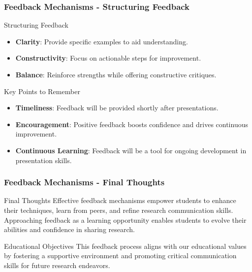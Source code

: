 \documentclass[aspectratio=169]{beamer}
\begin{document}
\begin{frame}[fragile]
    \frametitle{Feedback Mechanisms - Structuring Feedback}
    \begin{block}{Structuring Feedback}
        \begin{itemize}
            \item \textbf{Clarity}: Provide specific examples to aid understanding.
            \item \textbf{Constructivity}: Focus on actionable steps for improvement.
            \item \textbf{Balance}: Reinforce strengths while offering constructive critiques.
        \end{itemize}
    \end{block}
    
    \begin{block}{Key Points to Remember}
        \begin{itemize}
            \item \textbf{Timeliness}: Feedback will be provided shortly after presentations.
            \item \textbf{Encouragement}: Positive feedback boosts confidence and drives continuous improvement.
            \item \textbf{Continuous Learning}: Feedback will be a tool for ongoing development in presentation skills.
        \end{itemize}
    \end{block}
\end{frame}

\begin{frame}[fragile]
    \frametitle{Feedback Mechanisms - Final Thoughts}
    \begin{block}{Final Thoughts}
        Effective feedback mechanisms empower students to enhance their techniques, learn from peers, 
        and refine research communication skills. Approaching feedback as a learning opportunity enables students 
        to evolve their abilities and confidence in sharing research.
    \end{block}

    \begin{block}{Educational Objectives}
        This feedback process aligns with our educational values by fostering a supportive environment and 
        promoting critical communication skills for future research endeavors.
    \end{block}
\end{frame}
\end{document}
